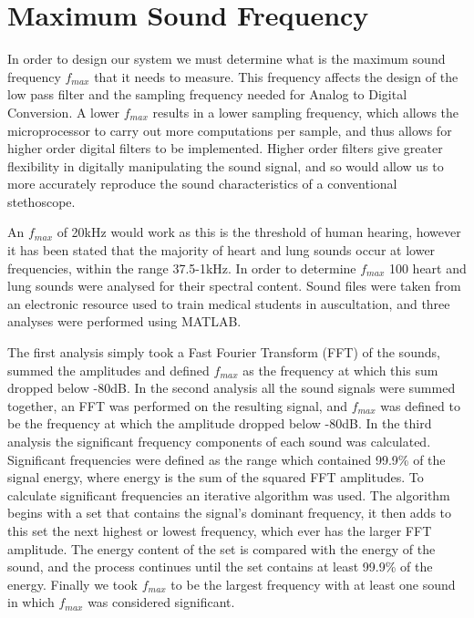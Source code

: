 \section{Maximum Sound Frequency} \label{max-sound-freq}
In order to design our system we must determine what is the maximum sound frequency $f_{max}$ that it needs to measure. This frequency affects the design of the low pass filter and the sampling frequency needed for Analog to Digital Conversion. A lower $f_{max}$ results in a lower sampling frequency, which allows the microprocessor to carry out more computations per sample, and thus allows for higher order digital filters to be implemented. Higher order filters give greater flexibility in digitally manipulating the sound signal, and so would allow us to more accurately reproduce the sound characteristics of a conventional stethoscope.

An $f_{max}$ of 20kHz would work as this is the threshold of human hearing\cite[p.~163]{Stuart2011}, however it has been stated that the majority of heart and lung sounds occur at lower frequencies, within the range 37.5-1kHz\cite{Abella1992}. In order to determine $f_{max}$ 100 heart and lung sounds were analysed for their spectral content. Sound files were taken from an electronic resource used to train medical students in auscultation\cite{Coviello2014}, and three analyses were performed using MATLAB. 

The first analysis simply took a Fast Fourier Transform (FFT) of the sounds, summed the amplitudes and defined $f_{max}$ as the frequency at which this sum dropped below -80dB. In the second analysis all the sound signals were summed together, an FFT was performed on the resulting signal, and $f_{max}$ was defined to be the frequency at which the amplitude dropped below -80dB. In the third analysis the significant frequency components of each sound was calculated. Significant frequencies were defined as the range which contained 99.9\% of the signal energy, where energy is the sum of the squared FFT amplitudes. To calculate significant frequencies an iterative algorithm was used. The algorithm begins with a set that contains the signal's dominant frequency, it then adds to this set the next highest or lowest frequency, which ever has the larger FFT amplitude. The energy content of the set is compared with the energy of the sound, and the process continues until the set contains at least 99.9\% of the energy. Finally we took $f_{max}$ to be the largest frequency with at least one sound in which $f_{max}$ was considered significant. 

